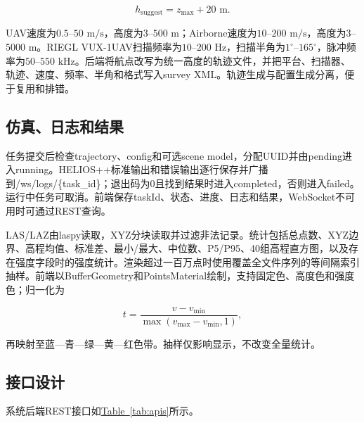 \documentclass[a4paper,fleqn]{cas-sc}
\newcommand{\refTab}[1]{\hyperref[#1]{Table~\ref*{#1}}}
\begin{document}
\begin{equation}
h_{\text{suggest}} = z_{\max} + 20\text{ m}.
\end{equation}

UAV速度为$0.5$--$50\text{ m/s}$，高度为$3$--$500\text{ m}$；Airborne速度为$10$--$200\text{ m/s}$，高度为$3$--$5000\text{ m}$。RIEGL VUX-1UAV扫描频率为$10$--$200\text{ Hz}$，扫描半角为$1^\circ$--$165^\circ$，脉冲频率为$50$--$550\text{ kHz}$。后端将航点改写为统一高度的轨迹文件，并把平台、扫描器、轨迹、速度、频率、半角和格式写入survey XML。轨迹生成与配置生成分离，便于复用和排错。

\subsection{仿真、日志和结果}

任务提交后检查trajectory、config和可选scene model，分配UUID并由pending进入running。HELIOS++标准输出和错误输出逐行保存并广播到/ws/logs/\{task\_id\}；退出码为0且找到结果时进入completed，否则进入failed。运行中任务可取消。前端保存taskId、状态、进度、日志和结果，WebSocket不可用时可通过REST查询。

LAS/LAZ由laspy读取\citep{laspy}，XYZ分块读取并过滤非法记录。统计包括总点数、XYZ边界、高程均值、标准差、最小/最大、中位数、P5/P95、40组高程直方图，以及存在强度字段时的强度统计。渲染超过一百万点时使用覆盖全文件序列的等间隔索引抽样。前端以BufferGeometry和PointsMaterial绘制，支持固定色、高度色和强度色；归一化为

\begin{equation}
t = \frac{v - v_{\min}}{\max(v_{\max} - v_{\min}, 1)},
\end{equation}

再映射至蓝—青—绿—黄—红色带。抽样仅影响显示，不改变全量统计。

\subsection{接口设计}

系统后端REST接口如\refTab{tab:apis}所示。
\end{document}
